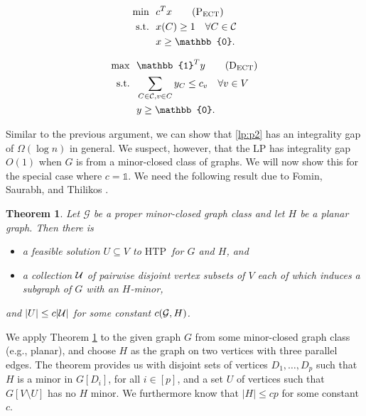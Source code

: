 \documentclass{article}
\newcommand{\st}{\ensuremath{\mbox{s.t.}}}
\newcommand{\htp}{\ensuremath{\mbox{HTP}}}
\newcommand{\ect}{\ensuremath{\mbox{ECT}}}
\newcommand{\C}{\ensuremath{\mathcal{C}}}
\newcommand{\0}{\mathbb{0}}
\newcommand{\1}{\mathbb{1}}
\newtheorem{theorem}{Theorem}[section]
\begin{document}
\medskip

\hspace*{-.7cm}
\begin{minipage}{.48\textwidth}
\begin{align}
  \min ~~ & c^Tx \tag{$\mbox{P}_{\scriptsize \ect}$} \label{lp:p2} \\
  \st ~~ & x(C) \geq 1 \quad \forall C\in \C \notag \\
          & x \geq \0. \notag
\end{align}
\end{minipage}
\hspace*{1ex}
\vline
\hspace*{1ex}
\begin{minipage}{.48\textwidth}
\begin{align}
  \max ~~ & \1^Ty \tag{$\mbox{D}_{\scriptsize \ect}$} \label{lp:d2} \\
  \st ~~ & \sum_{C \in \C, v \in C} y_C \leq c_v \quad \forall v \in V
           \notag \\
          & y \geq \0. \notag
\end{align}
\end{minipage}
\medskip

Similar to the previous argument, we can show that \eqref{lp:p2} has
an integrality gap of $\Omega(\log n)$ in general. 
We suspect, however, that the LP has integrality gap $O(1)$ when $G$ is from a
minor-closed class of graphs. We will now show this for the special
case where $c=\1$. We need the following result due to Fomin, Saurabh,
and Thilikos \cite{FST11}.

\begin{theorem}\label{thm:fst}
  Let $\mathcal{G}$ be a proper minor-closed graph class and let $H$ be
  a planar graph. Then there is
  \begin{itemize}
  \item a feasible solution $U \subseteq V$ to \htp\ for $G$ and $H$, and
  \item a collection $\cal{U}$ of pairwise
    disjoint vertex subsets of $V$ each of which induces a subgraph of
    $G$ with an $H$-minor,
  \end{itemize}
  and $|U| \leq c|{\cal U}|$ for some constant $c({\cal G},H)$.
\end{theorem}

We apply Theorem \ref{thm:fst} to the given graph $G$ from some
minor-closed graph class (e.g., planar), and choose $H$ as 
the graph on two vertices with three parallel edges. The theorem
provides us with disjoint sets of vertices $D_1, \ldots, D_p$ such
that $H$ is a minor in $G[D_i]$, for all $i \in [p]$, and a set $U$ of
vertices such that $G[V\setminus U]$ has no $H$ minor. We furthermore
know that $|H| \leq cp$ for some constant $c$.
\end{document}
